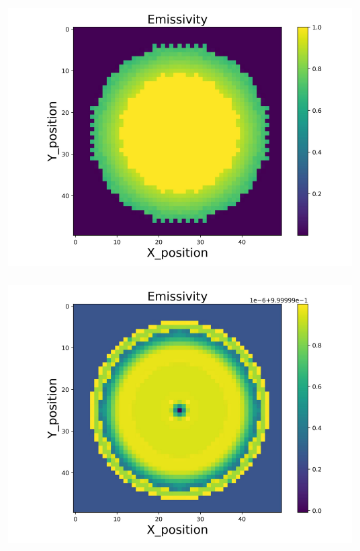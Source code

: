 \begin{figure}[p]
    \centering
    \begin{minipage}{\textwidth}
        \centering
        \begin{subfigure}{0.325\textwidth}
            \centering
            \includegraphics[width=\textwidth]{figures/raw_data/0/linear/emi_cal.jpg}
        \end{subfigure}
        \begin{subfigure}{0.325\textwidth}
            \centering
            \includegraphics[width=\textwidth]{figures/raw_data/5/linear/emi_cal.jpg}
        \end{subfigure}

\end{minipage}
\end{figure}
